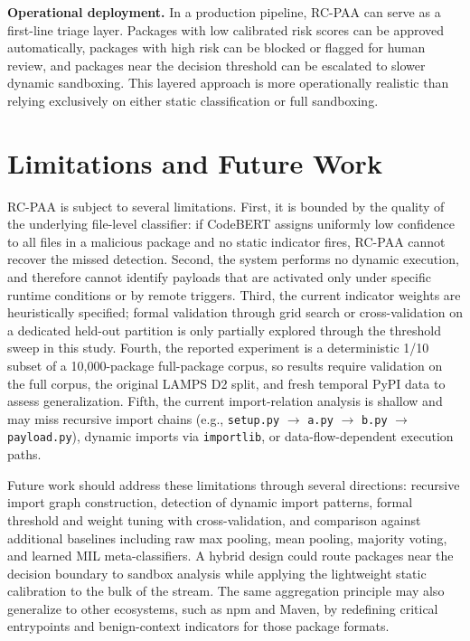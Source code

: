 \documentclass[conference,a4paper]{IEEEtran}
\newcommand{\rcpaa}{RC-PAA}
\newcommand{\codebert}{CodeBERT}
\begin{document}
\textbf{Operational deployment.} In a production pipeline, \rcpaa{} can serve as a
first-line triage layer. Packages with low calibrated risk scores can be approved
automatically, packages with high risk can be blocked or flagged for human review, and
packages near the decision threshold can be escalated to slower dynamic sandboxing.
This layered approach is more operationally realistic than relying exclusively on either
static classification or full sandboxing.


\section{Limitations and Future Work}

\rcpaa{} is subject to several limitations. First, it is bounded by the quality of the
underlying file-level classifier: if \codebert{} assigns uniformly low confidence to
all files in a malicious package and no static indicator fires, \rcpaa{} cannot recover
the missed detection. Second, the system performs no dynamic execution, and therefore
cannot identify payloads that are activated only under specific runtime conditions or by
remote triggers. Third, the current indicator weights are heuristically specified; formal
validation through grid search or cross-validation on a dedicated held-out partition
is only partially explored through the threshold sweep in this study. Fourth, the
reported experiment is a deterministic 1/10 subset of a 10,000-package full-package
corpus, so results require validation on the full corpus, the original LAMPS D2 split,
and fresh temporal PyPI data to assess generalization. Fifth, the current
import-relation analysis is shallow and may miss recursive import chains (e.g.,
\texttt{setup.py}
$\to$ \texttt{a.py} $\to$ \texttt{b.py} $\to$ \texttt{payload.py}), dynamic imports
via \texttt{importlib}, or data-flow-dependent execution paths.

Future work should address these limitations through several directions: recursive
import graph construction, detection of dynamic import patterns, formal threshold
and weight tuning with cross-validation, and comparison against additional baselines
including raw max pooling, mean pooling, majority voting, and learned MIL
meta-classifiers. A hybrid design could route packages near the decision boundary to
sandbox analysis while applying the lightweight static calibration to the bulk of the
stream. The same aggregation principle may also generalize to other ecosystems, such as
npm and Maven, by redefining critical entrypoints and benign-context indicators for
those package formats.
\end{document}
